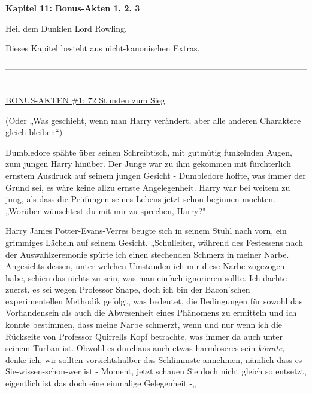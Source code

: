 

\hypertarget{bonus-akten-1-2-3}{%

\textbf{Kapitel 11: Bonus-Akten 1, 2, 3\\ }

\hfill\break Heil dem Dunklen Lord Rowling.

Dieses Kapitel besteht aus nicht-kanonischen Extras.

--------------------------------------------------------------------------------------------------------------------------------------------

\hfill\break

\uline{BONUS-AKTEN \#1: 72 Stunden zum Sieg}

\hfill\break

(Oder „Was geschieht, wenn man Harry verändert, aber alle anderen Charaktere gleich bleiben“)

\hfill\break Dumbledore spähte über seinen Schreibtisch, mit gutmütig funkelnden Augen, zum jungen Harry hinüber. Der Junge war zu ihm gekommen mit fürchterlich ernstem Ausdruck auf seinem jungen Gesicht - Dumbledore hoffte, was immer der Grund sei, es wäre keine allzu ernste Angelegenheit. Harry war bei weitem zu jung, als dass die Prüfungen seines Lebens jetzt schon beginnen mochten. „Worüber wünschtest du mit mir zu sprechen, Harry?"

Harry James Potter-Evans-Verres beugte sich in seinem Stuhl nach vorn, ein grimmiges Lächeln auf seinem Gesicht. „Schulleiter, während des Festessens nach der Auswahlzeremonie spürte ich einen stechenden Schmerz in meiner Narbe. Angesichts dessen, unter welchen Umständen ich mir diese Narbe zugezogen habe, schien das nichts zu sein, was man einfach ignorieren sollte. Ich dachte zuerst, es sei wegen Professor Snape, doch ich bin der Bacon'schen experimentellen Methodik gefolgt, was bedeutet, die Bedingungen für sowohl das Vorhandensein als auch die Abwesenheit eines Phänomens zu ermitteln und ich konnte bestimmen, dass meine Narbe schmerzt, wenn und nur wenn ich die Rückseite von Professor Quirrells Kopf betrachte, was immer da auch unter seinem Turban ist. Obwohl es durchaus auch etwas harmloseres sein \emph{könnte,} denke ich, wir sollten vorsichtshalber das Schlimmste annehmen, nämlich dass es Sie-wissen-schon-wer ist - Moment, jetzt schauen Sie doch nicht gleich so entsetzt, eigentlich ist das doch eine einmalige Gelegenheit -„

}

